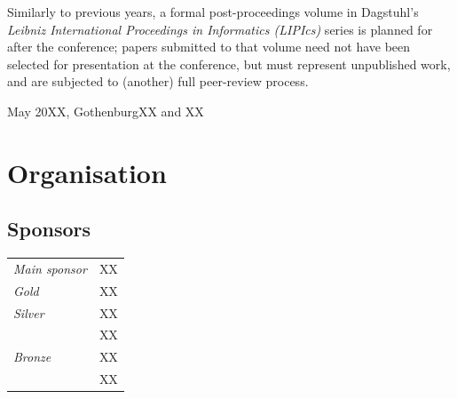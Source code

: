 \documentclass[a4paper,extrafontsizes,oneside]{memoir}
\begin{document}
Similarly to previous years, a formal post-proceedings volume in Dagstuhl’s \emph{Leibniz International Proceedings in Informatics (LIPIcs)} series is planned for after the conference; papers submitted to that volume need not have been selected for presentation at the conference, but must represent unpublished work, and are subjected to (another) full peer-review process.

\vspace{1em}

\noindent May 20XX, Gothenburg\hfill XX and XX

\openany

\chapter{Organisation}



\section*{Sponsors}

\begin{tabular}{@{}l@{\qquad}l}
  \emph{Main sponsor} &
  XX \\[1ex]
  \emph{Gold} &
  XX \\[1ex]
  \emph{Silver} &
  XX \\
  &
  XX \\[1ex]
  \emph{Bronze} &
  XX \\
  &
  XX  \\
\end{tabular}


\clearpage

\setcounter{tocdepth}{2}
{
  \renewcommand{\aftertoctitle}{\par\nobreak \mbox{}{\normalfont \normalsize An alphabetical index of all authors can be found on page~\pageref{indexpage}.}\par\nobreak}
  \small
  \tableofcontents
}

\clearpage

\mainmatter



\renewcommand{\indexname}{Author index}
\label{indexpage}
\printindex
\end{document}
